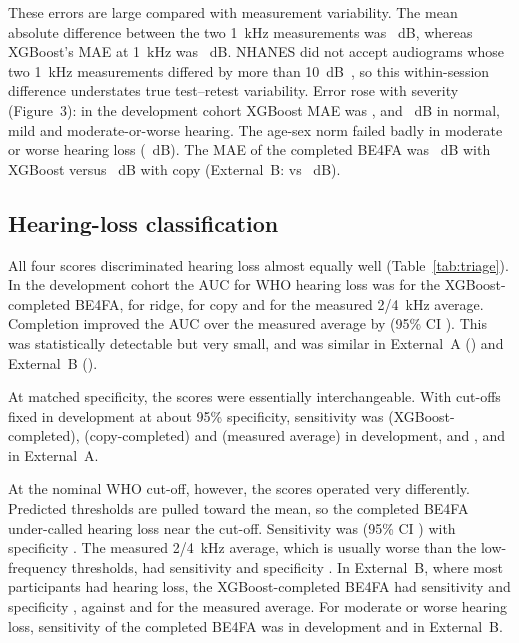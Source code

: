 \documentclass[11pt]{article}
\begin{document}
These errors are large compared with measurement variability. The mean absolute difference between the two 1~kHz measurements was \RetestDev{}~dB, whereas XGBoost's MAE at 1~kHz was \MaeXgbDevOne{}~dB. NHANES did not accept audiograms whose two 1~kHz measurements differed by more than 10~dB~\cite{nhanes_aux_g}, so this within-session difference understates true test--retest variability. Error rose with severity (Figure~3): in the development cohort XGBoost MAE was \MaeXgbDevNorm{}, \MaeXgbDevMild{} and \MaeXgbDevMod{}~dB in normal, mild and moderate-or-worse hearing. The age-sex norm failed badly in moderate or worse hearing loss (\MaeNormDevMod{}~dB). The MAE of the completed BE4FA was \FourFaMaeXgbDev{}~dB with XGBoost versus \FourFaMaeCopyDev{}~dB with copy (External~B: \FourFaMaeXgbExtB{} vs \FourFaMaeCopyExtB{}~dB).

\subsection*{Hearing-loss classification}
All four scores discriminated hearing loss almost equally well (Table~\ref{tab:triage}). In the development cohort the AUC for WHO hearing loss was \AucXgbTwentyDev{} for the XGBoost-completed BE4FA, \AucRidgeTwentyDev{} for ridge, \AucCopyTwentyDev{} for copy and \AucHfaTwentyDev{} for the measured 2/4~kHz average. Completion improved the AUC over the measured average by \AucDiffHfaTwentyDev{} (95\% CI \AucDiffCiHfaTwentyDev{}). This was statistically detectable but very small, and was similar in External~A (\AucDiffHfaTwentyExtA{}) and External~B (\AucDiffHfaTwentyExtB{}).

At matched specificity, the scores were essentially interchangeable. With cut-offs fixed in development at about 95\% specificity, sensitivity was \MsSensXgbDev{} (XGBoost-completed), \MsSensCopyDev{} (copy-completed) and \MsSensHfaDev{} (measured average) in development, and \MsSensXgbExtA{}, \MsSensCopyExtA{} and \MsSensHfaExtA{} in External~A.

At the nominal WHO cut-off, however, the scores operated very differently. Predicted thresholds are pulled toward the mean, so the completed BE4FA under-called hearing loss near the cut-off. Sensitivity was \SensXgbTwentyDev{} (95\% CI \SensCiXgbTwentyDev{}) with specificity \SpecXgbTwentyDev{}. The measured 2/4~kHz average, which is usually worse than the low-frequency thresholds, had sensitivity \SensHfaTwentyDev{} and specificity \SpecHfaTwentyDev{}. In External~B, where most participants had hearing loss, the XGBoost-completed BE4FA had sensitivity \SensXgbTwentyExtB{} and specificity \SpecXgbTwentyExtB{}, against \SensHfaTwentyExtB{} and \SpecHfaTwentyExtB{} for the measured average. For moderate or worse hearing loss, sensitivity of the completed BE4FA was \SensXgbThirtyFiveDev{} in development and \SensXgbThirtyFiveExtB{} in External~B.
\end{document}
